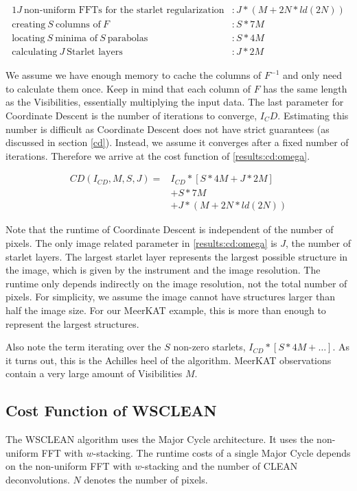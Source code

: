 \begin{alignat*}{1}
J\: \text{non-uniform FFTs for the starlet regularization} &: J*(M + 2N*ld(2N))\\
\text{creating} \:S\: \text{columns of}\: F &: S*7M\\
\text{locating} \:S\: \text{minima of} \:S\: \text{parabolas} &: S*4M\\
\text{calculating} \:J\: \text{Starlet layers} &: J * 2M
\end{alignat*}

We assume we have enough memory to cache the columns of $F^{-1}$ and only need to calculate them once. Keep in mind that each column of $F$ has the same length as the Visibilities, essentially multiplying the input data. The last parameter for Coordinate Descent is the number of iterations to converge, $I_CD$. Estimating this number is difficult as Coordinate Descent does not have strict guarantees (as discussed in section \ref{cd}). Instead, we assume it converges after a fixed number of iterations. Therefore we arrive at the cost function of \eqref{results:cd:omega}.

\begin{equation}\label{results:cd:omega}
\begin{aligned}
	CD(I_{CD}, M, S, J) = &I_{CD} * [S * 4M + J * 2M]\\
		&+  S*7M\\
		&+ J*(M + 2N*ld(2N))
\end{aligned}
\end{equation}

Note that the runtime of Coordinate Descent is independent of the number of pixels. The only image related parameter in \eqref{results:cd:omega} is $J$, the number of starlet layers. The largest starlet layer represents the largest possible structure in the image, which is given by the instrument and the image resolution. The runtime only depends indirectly on the image resolution, not the total number of pixels. For simplicity, we assume the image cannot have structures larger than half the image size. For our MeerKAT example, this is more than enough to represent the largest structures.

Also note the term iterating over the $S$ non-zero starlets, $ I_{CD} * [S * 4M +\ldots]$. As it turns out, this is the Achilles heel of the algorithm. MeerKAT observations contain a very large amount of Visibilities $M$.

\subsection{Cost Function of WSCLEAN}
The WSCLEAN algorithm uses the Major Cycle architecture. It uses the non-uniform FFT with $w$-stacking. The runtime costs of a single Major Cycle depends on the non-uniform FFT with $w$-stacking and the number of CLEAN deconvolutions. $N$ denotes the number of pixels.

